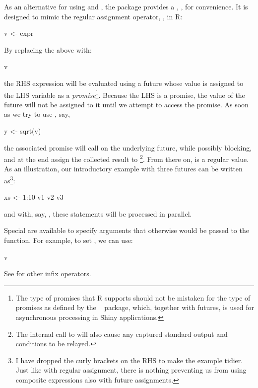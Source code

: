 As an alternative for using  and ,
the  package provides a , \code{\%<-\%}, for convenience.  It is designed to mimic
the regular assignment operator, \code{<-}, in R:
\begin{example}
v <- expr
\end{example}
By replacing the above with:
\begin{example}
v %
\end{example}
the RHS expression  will be evaluated using a future whose
value is assigned to the LHS variable  as a
\emph{promise}\footnote{The type of promises that R supports should
not be mistaken for the type of promises as defined by the
~\citep{CRAN:promises} package, which, together with
futures, is used for asynchronous processing in Shiny applications.}.
Because the LHS is a promise, the value of the future will not be
assigned to it until we attempt to access the promise.  As soon as we
try to use , say,
\begin{example}
y <- sqrt(v) 
\end{example}
the associated promise will call  on the underlying
future, while possibly blocking, and at the end assign the collected
result to \footnote{The internal call to  will
also cause any captured standard output and conditions to be
relayed.}.  From there on,  is a regular value.  As an
illustration, our introductory example with three futures can be
written as\footnote{I have dropped the curly brackets on the RHS to
make the example tidier. Just like with regular assignment, there is
nothing preventing us from using composite expressions also with
future assignments.}:
\begin{example}
xs <- 1:10
v1 %
v2 %
v3 %
\end{example}
and with, say, , these statements will be
processed in parallel.

Special  are available to specify arguments that
otherwise would be passed to the  function.  For
example, to set , we can use:
\begin{example}
v %
\end{example}
See  for other infix
operators.

